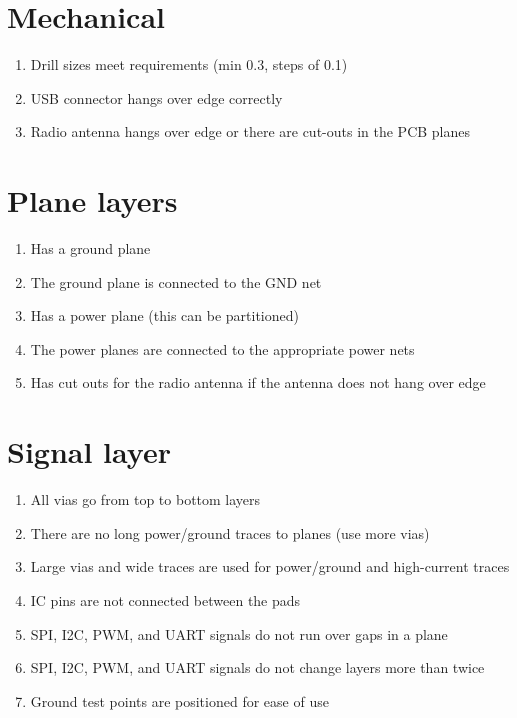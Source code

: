 \documentclass[a4paper, 12pt]{article}
\begin{document}
\section*{Mechanical}

\begin{enumerate}
\item Drill sizes meet requirements (min 0.3, steps of 0.1)

\item USB connector hangs over edge correctly
  
\item Radio antenna hangs over edge or there are cut-outs in the PCB planes  
\end{enumerate}

\pagebreak

\section*{Plane layers}

\begin{enumerate}
\item Has a ground plane
  
\item The ground plane is connected to the GND net

\item Has a power plane (this can be partitioned)

\item The power planes are connected to the appropriate power nets

\item Has cut outs for the radio antenna if the antenna does not hang
  over edge
\end{enumerate}


\section*{Signal layer}

\begin{enumerate}
\item All vias go from top to bottom layers

\item There are no long power/ground traces to planes (use more vias)
  
\item Large vias and wide traces are used for power/ground and
  high-current traces
  
\item IC pins are not connected between the pads
  
\item SPI, I2C, PWM, and UART signals do not run over gaps in a plane

\item SPI, I2C, PWM, and UART signals do not change layers more than twice

\item Ground test points are positioned for ease of use
\end{enumerate}
\end{document}

